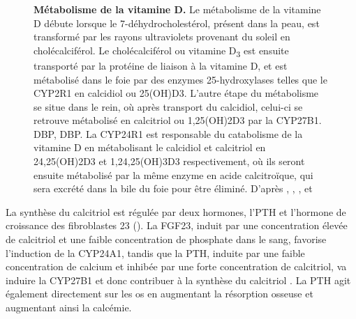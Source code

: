 \documentclass[
  a4paper,
  DIV=11,
  numbers=noendperiod,
  listof=totoc]{scrreprt}
\begin{document}
\begin{figure}


\caption[Métabolisme de la vitamine
D.]{\label{fig-vitd-metabolism}\textbf{Métabolisme de la vitamine D.} Le
métabolisme de la vitamine D débute lorsque le 7-déhydrocholestérol,
présent dans la peau, est transformé par les rayons ultraviolets
provenant du soleil en cholécalciférol. Le cholécalciférol ou vitamine
D\textsubscript{3} est ensuite transporté par la protéine de liaison à
la vitamine D, et est métabolisé dans le foie par des enzymes
25-hydroxylases telles que le CYP2R1 en calcidiol ou \ac{25(OH)D3}.
L'autre étape du métabolisme se situe dans le rein, où après transport
du calcidiol, celui-ci se retrouve métabolisé en calcitriol ou
\ac{1,25(OH)2D3} par la \ac{CYP27B1}. \ac{DBP}, \acl{DBP}. La CYP24R1
est responsable du catabolisme de la vitamine D en métabolisant le
calcidiol et calcitriol en \ac{24,25(OH)2D3} et \ac{1,24,25(OH)3D3}
respectivement, où ils seront ensuite métabolisé par la même enzyme en
acide calcitroïque, qui sera excrété dans la bile du foie pour être
éliminé. D'après \textcite{Dankers.2017}, \textcite{Tsiaras.2011},
\textcite{Christakos.2010}, et \textcite{Prosser.2004}}

\end{figure}%

La synthèse du calcitriol est régulée par deux hormones, l'\acf{PTH} et
l'hormone de croissance des fibroblastes 23 (). La
\ac{FGF23}, induit par une concentration élevée de calcitriol et une
faible concentration de phosphate dans le sang, favorise l'induction de
la \ac{CYP24A1}, tandis que la \ac{PTH}, induite par une faible
concentration de calcium et inhibée par une forte concentration de
calcitriol, va induire la \ac{CYP27B1} et donc contribuer à la synthèse
du calcitriol \autocite{Dankers.2017,Christakos.2010}. La \ac{PTH} agit
également directement sur les os en augmentant la résorption osseuse et
augmentant ainsi la calcémie.
\end{document}
